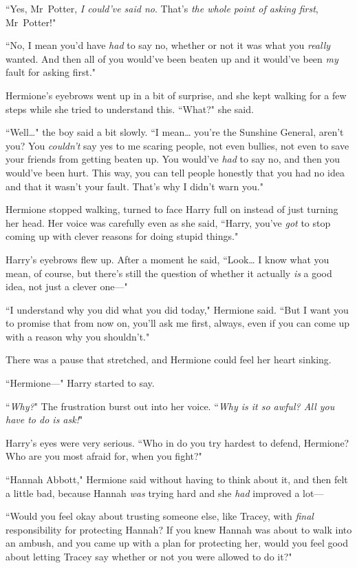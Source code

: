 ``Yes, Mr~Potter, \emph{I could've said no}. That's \emph{the whole point of asking first}, Mr~Potter!"

``No, I mean you'd have \emph{had} to say no, whether or not it was what you \emph{really} wanted. And then all of you would've been beaten up and it would've been \emph{my} fault for asking first."

Hermione's eyebrows went up in a bit of surprise, and she kept walking for a few steps while she tried to understand this. ``What?" she said.

``Well{\ldots}" the boy said a bit slowly. ``I mean{\ldots} you're the Sunshine General, aren't you? You \emph{couldn't} say yes to me scaring people, not even bullies, not even to save your friends from getting beaten up. You would've \emph{had} to say no, and then you would've been hurt. This way, you can tell people honestly that you had no idea and that it wasn't your fault. That's why I didn't warn you."

Hermione stopped walking, turned to face Harry full on instead of just turning her head. Her voice was carefully even as she said, ``Harry, you've \emph{got} to stop coming up with clever reasons for doing stupid things."

Harry's eyebrows flew up. After a moment he said, ``Look{\ldots} I know what you mean, of course, but there's still the question of whether it actually \emph{is} a good idea, not just a clever one—"

``I understand why you did what you did today," Hermione said. ``But I want you to promise that from now on, you'll ask me first, always, even if you can come up with a reason why you shouldn't."

There was a pause that stretched, and Hermione could feel her heart sinking.

``Hermione—" Harry started to say.

``\emph{Why?}" The frustration burst out into her voice. ``\emph{Why is it so awful? All you have to do is ask!}"

Harry's eyes were very serious. ``Who in \SPHEW do you try hardest to defend, Hermione? Who are you most afraid for, when you fight?"

``Hannah Abbott," Hermione said without having to think about it, and then felt a little bad, because Hannah \emph{was} trying hard and she \emph{had} improved a lot—

``Would you feel okay about trusting someone else, like Tracey, with \emph{final} responsibility for protecting Hannah? If you knew Hannah was about to walk into an ambush, and you came up with a plan for protecting her, would you feel good about letting Tracey say whether or not you were allowed to do it?"

